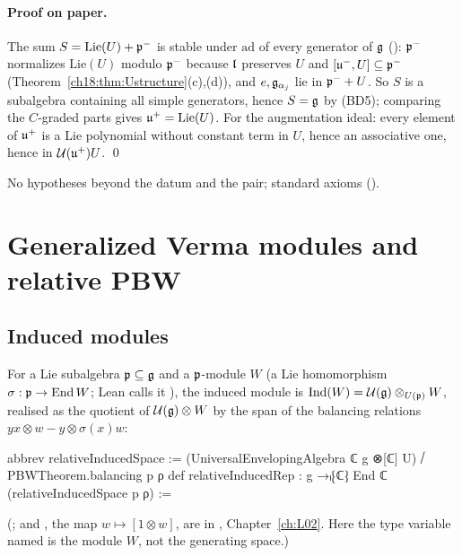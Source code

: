\paragraph{Proof on paper.}  The sum $S=\mathrm{Lie}(U)+\mathfrak{p}^-$ is stable under $\mathrm{ad}$ of every generator of $\mathfrak{g}$
(): $\mathfrak{p}^-$ normalizes $\mathrm{Lie}(U)$ modulo $\mathfrak{p}^-$ because $\mathfrak{l}$ preserves $U$ and
$[\mathfrak{u}^-,U]\subseteq\mathfrak{p}^-$ (Theorem~\ref{ch18:thm:Ustructure}(c),(d)), and $e,\mathfrak{g}_{\alpha_j}$ lie in $\mathfrak{p}^-+U$.  So $S$ is a subalgebra containing
all simple generators, hence $S=\mathfrak{g}$ by (BD5); comparing the $C$-graded parts gives $\mathfrak{u}^+=\mathrm{Lie}(U)$.  For the augmentation
ideal: every element of $\mathfrak{u}^+$ is a Lie polynomial without constant term in $U$, hence an associative one, hence in $\mathcal U(\mathfrak{u}^+)U$. \qed
\begin{status}No hypotheses beyond the datum and the pair; standard axioms ().\end{status}

\section{Generalized Verma modules and relative PBW}\label{ch18:sec:verma}

\subsection{Induced modules}

For a Lie subalgebra $\mathfrak{p}\subseteq\mathfrak{g}$ and a $\mathfrak{p}$-module $W$ (a Lie homomorphism $\sigma:\mathfrak{p}\to\operatorname{End} W$; Lean calls it ), the induced module is
$\mathrm{Ind}(W)=\mathcal U(\mathfrak{g})\otimes_{U(\mathfrak{p})}W$, realised as the quotient of $\mathcal U(\mathfrak{g})\otimes W$ by the span of the balancing relations
$yx\otimes w-y\otimes\sigma(x)w$:
\begin{leancode}
abbrev relativeInducedSpace :=
  (UniversalEnvelopingAlgebra ℂ g ⊗[ℂ] U) ⧸ PBWTheorem.balancing p ρ
def relativeInducedRep : g →ₗ⁅ℂ⁆ End ℂ (relativeInducedSpace p ρ) :=
\end{leancode}
(;  and , the
map $w\mapsto[1\otimes w]$, are in , Chapter~\ref{ch:L02}.  Here the type
variable named  is the module $W$, not the generating space.)


